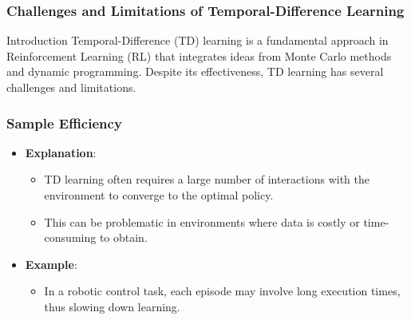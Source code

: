 \documentclass[aspectratio=169]{beamer}
\begin{document}
\begin{frame}[fragile]
    \frametitle{Challenges and Limitations of Temporal-Difference Learning}
    \begin{block}{Introduction}
        Temporal-Difference (TD) learning is a fundamental approach in Reinforcement Learning (RL) that integrates ideas from Monte Carlo methods and dynamic programming. Despite its effectiveness, TD learning has several challenges and limitations.
    \end{block}
\end{frame}

\begin{frame}[fragile]
    \frametitle{Sample Efficiency}
    \begin{itemize}
        \item \textbf{Explanation}:
        \begin{itemize}
            \item TD learning often requires a large number of interactions with the environment to converge to the optimal policy.
            \item This can be problematic in environments where data is costly or time-consuming to obtain.
        \end{itemize}
        \item \textbf{Example}:
        \begin{itemize}
            \item In a robotic control task, each episode may involve long execution times, thus slowing down learning.
        \end{itemize}
    \end{itemize}
\end{frame}
\end{document}
